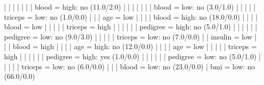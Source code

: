 |   |   |   |   |   |   |   blood = high: no (11.0/2.0)
|   |   |   |   |   |   |   blood = low: no (3.0/1.0)
|   |   |   |   |   triceps = low: no (1.0/0.0)
|   |   |   age = low
|   |   |   |   blood = high: no (18.0/0.0)
|   |   |   |   blood = low
|   |   |   |   |   triceps = high
|   |   |   |   |   |   pedigree = high: no (5.0/1.0)
|   |   |   |   |   |   pedigree = low: no (9.0/3.0)
|   |   |   |   |   triceps = low: no (7.0/0.0)
|   |   insulin = low
|   |   |   blood = high
|   |   |   |   age = high: no (12.0/0.0)
|   |   |   |   age = low
|   |   |   |   |   triceps = high
|   |   |   |   |   |   pedigree = high: yes (1.0/0.0)
|   |   |   |   |   |   pedigree = low: no (5.0/1.0)
|   |   |   |   |   triceps = low: no (6.0/0.0)
|   |   |   blood = low: no (23.0/0.0)
|   bmi = low: no (66.0/0.0)
